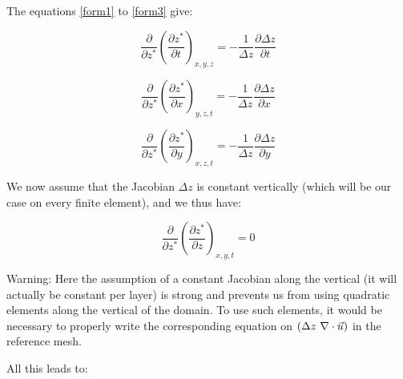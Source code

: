 The equations \eqref{form1} to \eqref{form3} give:%

\begin{equation}
\dfrac{\partial}{\partial z^{\ast}}\left(  \dfrac{\partial z^{\ast}}{\partial
t}\right)  _{x,y,z}=-\dfrac{1}{\Delta z}\dfrac{\partial \Delta z}{\partial t}%
\end{equation}
%

\begin{equation}
\dfrac{\partial}{\partial z^{\ast}}\left(  \dfrac{\partial z^{\ast}}{\partial
x}\right)  _{y,z,t}=-\dfrac{1}{\Delta z}\dfrac{\partial \Delta z}{\partial x}%
\end{equation}
%

\begin{equation}
\dfrac{\partial}{\partial z^{\ast}}\left(  \dfrac{\partial z^{\ast}}{\partial
y}\right)  _{x,z,t}=-\dfrac{1}{\Delta z}\dfrac{\partial \Delta z}{\partial y}%
\end{equation}


We now assume that the Jacobian%
$\Delta z$ is constant vertically (which will be our case on every finite
element), and we thus have:%

\begin{equation}
\dfrac{\partial}{\partial z^{\ast}}\left(  \dfrac{\partial z^{\ast}}{\partial
z}\right)  _{x,y,t}=0
\end{equation}

\begin{WarningBlock}{Warning:}
Here the assumption of a constant Jacobian along the vertical (it will actually be constant per layer)
is strong and prevents us from using quadratic elements along the vertical of the domain.
To use such elements, it would be necessary to properly write the corresponding equation
on $(\Delta z~\nabla \cdot\vec{u})$ in the reference mesh.
\end{WarningBlock}

All this leads to:%

